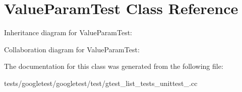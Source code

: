 \hypertarget{classValueParamTest}{}\section{Value\+Param\+Test Class Reference}
\label{classValueParamTest}


Inheritance diagram for Value\+Param\+Test\+:


Collaboration diagram for Value\+Param\+Test\+:


The documentation for this class was generated from the following file\+:\begin{DoxyCompactItemize}
\item 
tests/googletest/googletest/test/gtest\+\_\+list\+\_\+tests\+\_\+unittest\+\_\+.\+cc\end{DoxyCompactItemize}
